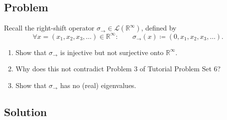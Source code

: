 \documentclass[12pt]{article}
\newcommand{\R}{\mathbb{R}}
\newcommand{\cL}{\mathcal{L}}
\begin{document}
\subsection{Problem}
Recall the right-shift operator $\sigma_{\rightarrow}\in \cL(\R^\infty)$, defined by
\[
\forall x=(x_1,x_2,x_3,\dots)\in \R^\infty:\qquad
\sigma_{\rightarrow}(x)\coloneqq (0,x_1,x_2,x_3,\dots).
\]
\begin{enumerate}[label=(\alph*)]
\item Show that $\sigma_{\rightarrow}$ is injective but not surjective onto $\R^\infty$.
\item Why does this not contradict Problem 3 of Tutorial Problem Set 6?
\item Show that $\sigma_{\rightarrow}$ has no (real) eigenvalues.
\end{enumerate}

\subsection{Solution}
\end{document}
